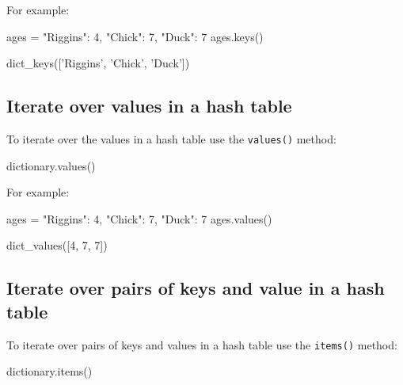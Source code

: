 For example:




\begin{pyin}
ages = {"Riggins": 4, "Chick": 7, "Duck": 7}
ages.keys()
\end{pyin}





\begin{raw}
dict_keys(['Riggins', 'Chick', 'Duck'])
\end{raw}





\subsection{Iterate over values in a hash table}
\label{\detokenize{building-tools/02-functions-and-data-structures/how/main:iterate-over-values-in-a-hash-table}}

To iterate over the values in a hash table use the \texttt{values()} method:


\begin{api}
dictionary.values()
\end{api}



For example:




\begin{pyin}
ages = {"Riggins": 4, "Chick": 7, "Duck": 7}
ages.values()
\end{pyin}





\begin{pyin}
dict_values([4, 7, 7])
\end{pyin}





\subsection{Iterate over pairs of keys and value in a hash table}
\label{\detokenize{building-tools/02-functions-and-data-structures/how/main:iterate-over-pairs-of-keys-and-value-in-a-hash-table}}

To iterate over pairs of keys and values in a hash table use the \texttt{items()} method:


\begin{api}
dictionary.items()
\end{api}



